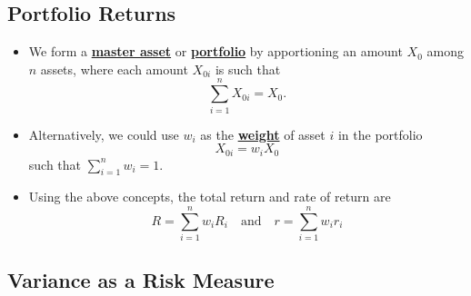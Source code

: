 \documentclass[twocolumn,landscape,10pt]{article}
\theoremstyle{definition}
\begin{document}
\subsection{Portfolio Returns}

\begin{itemize}
    \item We form a \textbf{\underline{master asset}} or
        \textbf{\underline{portfolio}} by apportioning an amount $X_0$ among $n$
        assets, where each amount $X_{0i}$ is such that
        \[
            \sum_{i=1}^{n} X_{0i}=X_0.
        \]
    \item Alternatively, we could use $w_i$ as the \textbf{\underline{weight}}
        of asset $i$ in the portfolio
        \[
            X_{0i}=w_iX_0
        \]
        such that $\sum_{i=1}^{n} w_i=1$.
    \item Using the above concepts, the total return and rate of return are
        \[
            R=\sum_{i=1}^{n} w_iR_i
            \quad\text{and}\quad
            r=\sum_{i=1}^{n} w_ir_i
        \]
\end{itemize}

\subsection{Variance as a Risk Measure}
\end{document}
